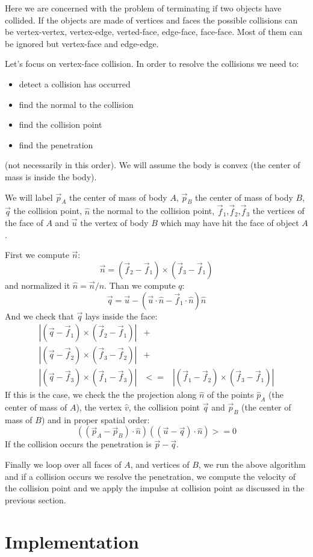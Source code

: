 \documentclass[12pt]{article}
\begin{document}
Here we are concerned with the problem of terminating if two objects have collided. If the objects are made of vertices and faces the possible collisions can be vertex-vertex, vertex-edge, verted-face, edge-face, face-face. Most of them can be ignored but vertex-face and edge-edge.

Let's focus on vertex-face collision. In order to resolve the collisions we need to:
\begin{itemize}
\item detect a collision has occurred
\item find the normal to the collision
\item find the collision point
\item find the penetration
\end{itemize}

(not necessarily in this order). We will assume the body is convex (the center of mass is inside the body).

We will label $\vec p_A$ the center of mass of body $A$, $\vec p_B$ the center of mass of body $B$, $\vec q$ the collision point, $\hat n$ the normal to the collision point, $\vec f_1$,$\vec f_2$,$\vec f_3$ the vertices of the face of $A$ and $\vec u$ the vertex of body $B$ which may have hit the face of object $A$.

First we compute $\vec n$:
\begin{equation}
\vec n = (\vec f_2 - \vec f_1) \times (\vec f_3 - \vec f_1)
\end{equation}
and normalized it $\hat n = \vec n / n$.
Than we compute $q$:
\begin{equation}
\vec q = \vec u - (\vec u \cdot \hat n - \vec f_1 \cdot \hat n){\hat n}
\end{equation}
And we check that $\vec q$ lays inside the face:
\begin{eqnarray}
|(\vec q - \vec f_1)\times(\vec f_2-\vec f_1)|&+& \\
|(\vec q - \vec f_2)\times(\vec f_3-\vec f_2)|&+& \\
|(\vec q - \vec f_3)\times(\vec f_1-\vec f_3)| &<=& |(\vec f_1 - \vec f_2)\times(\vec f_3-\vec f_1)|
\end{eqnarray}
If this is the case, we check the the projection along $\hat n$ of the points $\hat p_A$ (the center of mass of $A$), the vertex $\hat v$, the collision point $\vec q$ and $\vec p_B$ (the center of mass of $B$) and in proper spatial order:
\begin{equation}
((\vec p_A - \vec p_B) \cdot \hat n) ((\vec u - \vec q) \cdot\hat n) >=0
\end{equation}
If the collision occurs the penetration is $\vec p - \vec q$.

Finally we loop over all faces of $A$, and vertices of $B$, we run the above algorithm and if a collision occurs we resolve the penetration, we compute the velocity of the collision point and we apply the impulse at collision point as discussed in the previous section.

\section{Implementation}


\end{document}
